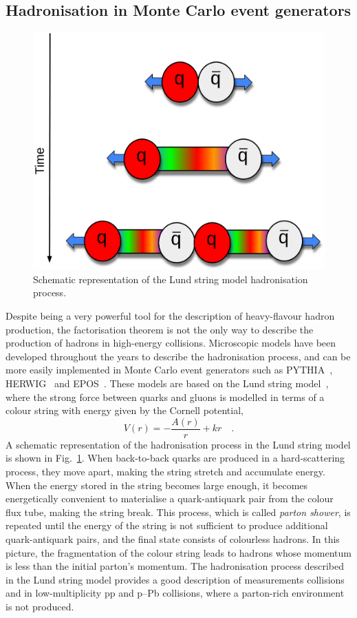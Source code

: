 \subsection{Hadronisation in Monte Carlo event generators}
\begin{figure}[htb]
    \centering
    \includegraphics[width=0.7\linewidth]{Figures/Chapter 2/Lund.png}
    \caption{Schematic representation of the Lund string model hadronisation process.}
    \label{fig:Lund}
\end{figure}
Despite being a very powerful tool for the description of heavy-flavour hadron production, the factorisation theorem is not the only way to describe the production of hadrons in high-energy collisions. Microscopic models have been developed throughout the years to describe the hadronisation process, and can be more easily implemented in Monte Carlo event generators such as PYTHIA~\cite{Bierlich:2022pfr}, HERWIG~\cite{Bahr:2008pv} and EPOS~\cite{Porteboeuf:2008fgf}. These models are based on the Lund string model~\cite{Andersson:1983ia}, where the strong force between quarks and gluons is modelled in terms of a colour string with energy given by the Cornell potential,
\begin{equation*}
    V(r) = -\frac{A(r)}{r} + kr\quad .
\end{equation*}
A schematic representation of the hadronisation process in the Lund string model is shown in Fig.~\ref{fig:Lund}. When back-to-back quarks are produced in a hard-scattering process, they move apart, making the string stretch and accumulate energy. When the energy stored in the string becomes large enough, it becomes energetically convenient to materialise a quark-antiquark pair from the colour flux tube, making the string break. This process, which is called \emph{parton shower}, is repeated until the energy of the string is not sufficient to produce additional quark-antiquark pairs, and the final state consists of colourless hadrons. In this picture, the fragmentation of the colour string leads to hadrons whose momentum is less than the initial parton's momentum. The hadronisation process described in the Lund string model provides a good description of measurements \ee collisions and in low-multiplicity pp and p--Pb collisions, where a parton-rich environment is not produced.

